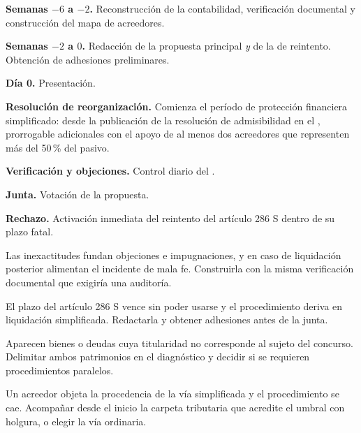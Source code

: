 \begin{checklist}
  \item \textbf{Semanas $-6$ a $-2$.} Reconstrucción de la contabilidad, verificación
  documental y construcción del mapa de acreedores.
  \item \textbf{Semanas $-2$ a $0$.} Redacción de la propuesta principal \emph{y} de la
  de reintento. Obtención de adhesiones preliminares.
  \item \textbf{Día 0.} Presentación.
  \item \textbf{Resolución de reorganización.} Comienza el período de protección financiera
  simplificado:  desde la publicación de la resolución de admisibilidad en el
  \boletin{}, prorrogable  adicionales con el apoyo de al
  menos dos acreedores que representen más del 50\,\% del pasivo.
  \item \textbf{Verificación y objeciones.} Control diario del \boletin{}.
  \item \textbf{Junta.} Votación de la propuesta.
  \item \textbf{Rechazo.} Activación inmediata del reintento del artículo 286 S dentro de
  su plazo fatal.
\end{checklist}

\bloqueErrores

{Las inexactitudes fundan objeciones e impugnaciones, y en caso de liquidación posterior
alimentan el incidente de mala fe.}
{Construirla con la misma verificación documental que exigiría una auditoría.}

{El plazo del artículo 286 S vence sin poder usarse y el procedimiento deriva en
liquidación simplificada.}
{Redactarla y obtener adhesiones antes de la junta.}

{Aparecen bienes o deudas cuya titularidad no corresponde al sujeto del concurso.}
{Delimitar ambos patrimonios en el diagnóstico y decidir si se requieren procedimientos
paralelos.}

{Un acreedor objeta la procedencia de la vía simplificada y el procedimiento se cae.}
{Acompañar desde el inicio la carpeta tributaria que acredite el umbral con holgura, o
elegir la vía ordinaria.}
